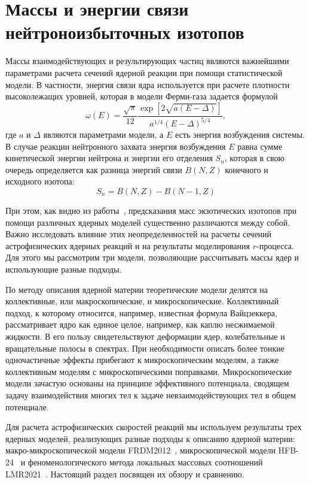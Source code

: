 \section{Массы и энергии связи нейтроноизбыточных изотопов} \label{massmodel}
Массы взаимодействующих и результирующих частиц являются важнейшими параметрами расчета сечений ядерной реакции при помощи статистической модели. В частности, энергия связи ядра используется при расчете плотности высоколежащих уровней, которая в модели Ферми-газа задается формулой
\begin{equation} \displaystyle
  \omega(E) = \frac{\sqrt{\pi}}{12} 
  \frac{\exp [ 2\sqrt{a(E-\Delta)} ] }
       {a^{1/4}(E-\Delta)^{5/4}},
\end{equation}
где $a$ и $\Delta$ являются параметрами модели, а $E$ есть энергия возбуждения системы. В случае реакции нейтронного захвата энергия возбуждения $E$ равна сумме кинетической энергии нейтрона и энергии его отделения $S_n$, которая в свою очередь определяется как разница энергий связи $B(N,Z)$ конечного и исходного изотопа:
\begin{equation}
S_n = B(N, Z) - B(N - 1, Z)
\end{equation}

При этом, как видно из работы~\cite{sobiczewski2018}, предсказания масс экзотических изотопов при помощи различных ядерных моделей существенно различаются между собой. Важно исследовать влияние этих неопределенностей на расчеты сечений астрофизических ядерных реакций и на результаты моделирования $r$-процесса. Для этого мы рассмотрим три модели, позволяющие рассчитывать массы ядер и использующие разные подходы.

По методу описания ядерной материи теоретические модели делятся на коллективные, или макроскопические, и микроскопические. Коллективный подход, к которому относится, например, известная формула Вайцзеккера, рассматривает ядро как единое целое, например, как каплю несжимаемой жидкости. В его пользу свидетельствуют деформации ядер, колебательные и вращательные полосы в спектрах. При необходимости описать более тонкие одночастичные эффекты прибегают к микроскопическим моделям, а также коллективным моделям с микроскопическими поправками. Микроскопические модели зачастую основаны на принципе эффективного потенциала, сводящем задачу взаимодействия многих тел к задаче невзаимодействующих тел в общем потенциале.

Для расчета астрофизических скоростей реакций мы используем результаты трех ядерных моделей, реализующих разные подходы к описанию ядерной материи: макро-микроскопической модели FRDM2012~\cite{moller2016}, микроскопической модели HFB-24~\cite{goriely2013} и феноменологического метода локальных массовых соотношений LMR2021~\cite{vladimirova2022}. Настоящий раздел посвящен их обзору и сравнению.




